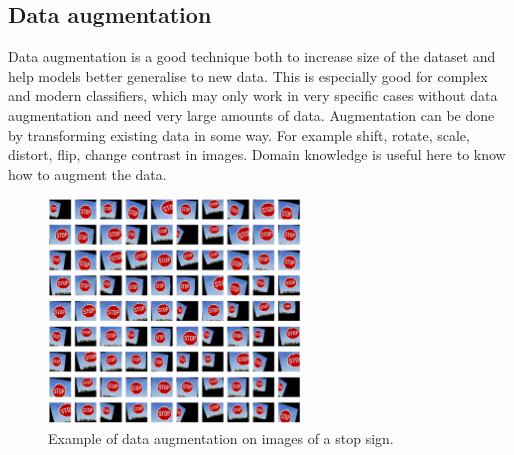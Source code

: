 \documentclass[CS5104-Notes.tex]{subfiles}
\begin{document}
\subsection{Data augmentation}
Data augmentation is a good technique both to increase size of the dataset and help models better generalise to new data. This is especially good for complex and modern classifiers, which may only work in very specific cases without data augmentation and need very large amounts of data. Augmentation can be done by transforming existing data in some way. For example shift, rotate, scale, distort, flip, change contrast in images. Domain knowledge is useful here to know how to augment the data. 
\begin{figure}[H]
\centering
\includegraphics[width=0.6\textwidth, keepaspectratio]{imgs/data-augmentation.png}
\caption{Example of data augmentation on images of a stop sign.}
\end{figure}
 
 
\end{document}
